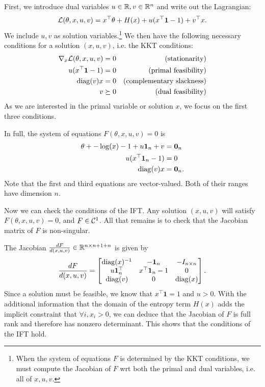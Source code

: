 \documentclass[11pt]{article}
\begin{document}
First, we introduce dual variables $u\in\mathbb{R},v\in\mathbb{R}^n$ and write out the Lagrangian:
$$\mathcal{L}(\theta, x, u, v) = x^\top\theta + H(x) + u(x^\top \mathbf{1} - 1) + v^\top x.$$
We include $u,v$ as solution variables.\footnote{
When the system of equations $F$ is determined by the KKT conditions,
we must compute the Jacobian of $F$ wrt both the primal and dual variables,
i.e. all of $x,u,v$.
}
We then have the following necessary conditions for a solution $(x,u,v)$,
i.e. the KKT conditions:
\begin{equation}
\begin{aligned}
\nabla_x \mathcal{L}(\theta, x,u,v) = 0 && \textrm{(stationarity)}\\
u(x^{\top} \mathbf{1} - 1) = 0 && \textrm{(primal feasibility)}\\
\mathrm{diag}(v)x = 0 && \textrm{(complementary slackness)}\\
v \succeq 0 && \textrm{(dual feasibility)}
\end{aligned}
\end{equation}
As we are interested in the primal variable or solution $x$,
we focus on the first three conditions.

In full, the system of equations $F(\theta, x,u,v) = 0$ is
\begin{equation}
\label{eqn:system}
\begin{aligned}
\theta + -\log(x) - 1 + u\mathbf{1}_n + v &= \mathbf{0}_n\\
u(x^{\top} \mathbf{1}_n - 1) &= 0\\
\mathrm{diag}(v)x &= \mathbf{0}_n.
\end{aligned}
\end{equation}
Note that the first and third equations are vector-valued.
Both of their ranges have dimension $n$.

Now we can check the conditions of the IFT.
Any solution $(x,u,v)$ will satisfy $F(\theta, x,u,v) = 0$,
and $F \in \mathcal{C}^1$.
All that remains is to check that the Jacobian matrix of $F$ is non-singular.

The Jacobian $\frac{dF}{d(x,u,v)}\in\mathbb{R}^{n\times n+1+n}$ is given by
\begin{equation}
\label{eqn:f-jac}
\frac{dF}{d(x,u,v)}=
\begin{bmatrix}
\mathrm{diag}(x)^{-1} & -\mathbf{1}_n & -I_{n\times n} \\
u\mathbf{1}_n^\top & x^\top\mathbf{1}_n - 1 & 0\\
\mathrm{diag}(v) & 0 & \mathrm{diag}(x)
\end{bmatrix}.
\end{equation}
Since a solution must be feasible, we know that $x^\top\mathbf{1} = 1$ and $u > 0$.
With the additional information that the domain of the entropy term $H(x)$
adds the implicit constraint that $\forall i, x_i > 0$,
we can deduce that the Jacobian of $F$ is full rank and therefore has nonzero determinant.
This shows that the conditions of the IFT hold.
\end{document}
